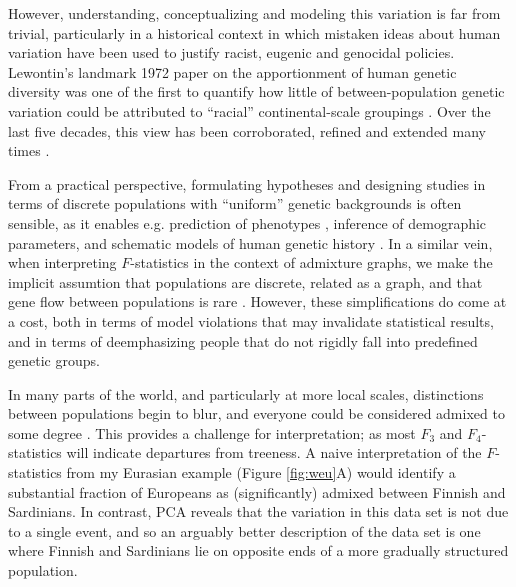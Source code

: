 \documentclass[12pt,fullpage, a4paper]{article}
\begin{document}
However, understanding, conceptualizing and modeling this variation is far from trivial, particularly in a historical context in which mistaken ideas about human variation have been used to justify racist, eugenic and genocidal policies. Lewontin’s landmark 1972 paper on the apportionment of human genetic diversity was one of the first to quantify how little of between-population genetic variation could be attributed to ``racial'' continental-scale groupings \citep{novembre2022}. Over the last five decades, this view has been corroborated, refined and extended many times \citep{cann1987, cavalli-sforza1994, barbujani1997, rosenberg2002a}. 

From a practical perspective, formulating hypotheses and designing studies in terms of discrete populations with ``uniform'' genetic backgrounds is often sensible, as it enables  e.g. prediction of phenotypes \citep{berg2019, yair2021}, inference of demographic parameters, and schematic models of human genetic history \citep{patterson2012}. In a similar vein, when interpreting $F$-statistics in the context of admixture graphs, we make the  implicit assumtion that populations are discrete, related as a graph, and that gene flow between populations is rare \citep{patterson2012,harney2021}.
However, these simplifications do come at a cost, both in terms of model violations that may invalidate statistical results, and in terms of deemphasizing people that do not rigidly fall into predefined genetic groups.


In many parts of the world, and particularly at more local scales, distinctions between populations begin to blur, and everyone could be considered  admixed to some degree \citep{pickrell2014}. This provides a challenge for interpretation; as most $F_3$ and $F_4$-statistics will indicate departures from treeness. A naive interpretation of the $F$-statistics from my Eurasian example  (Figure \ref{fig:weu}A) would identify a substantial fraction of Europeans as (significantly) admixed between Finnish and Sardinians. In contrast, PCA reveals that the variation in this data set is not due to a single event, and so an arguably better description of the data set is one where Finnish and Sardinians lie on opposite ends of a more gradually structured population.
\end{document}

